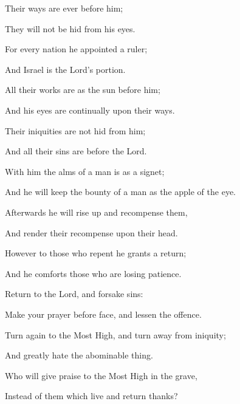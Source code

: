 {\par }{\BB \par }{\Q {}Their ways are ever before him;
\par }{\Q They will not be hid from his eyes.
\par }{\Q {} For every nation he appointed a ruler;
\par }{\Q And Israel is the Lord’s portion.
\par }{\Q {}All their works are as the sun before him;
\par }{\Q And his eyes are continually upon their ways.
\par }{\Q {}Their iniquities are not hid from him;
\par }{\Q And all their sins are before the Lord.
\par }{\Q {}With him the alms of a man is as a signet;
\par }{\Q And he will keep the bounty of a man as the apple of the eye.
\par }{\Q {}Afterwards he will rise up and recompense them,
\par }{\Q And render their recompense upon their head.
\par }{\Q {}However to those who repent he grants a return;
\par }{\Q And he comforts those who are losing patience.
\par }{\BB \par }{\Q {}Return to the Lord, and forsake sins:
\par }{\Q Make your prayer before
{} face, and lessen the offence.
\par }{\Q {}Turn again to the Most High, and turn away from iniquity;
\par }{\Q And greatly hate the abominable thing.
\par }{\Q {}Who will give praise to the Most High in
 the grave,
\par }{\Q Instead of them which live and return thanks?
}
